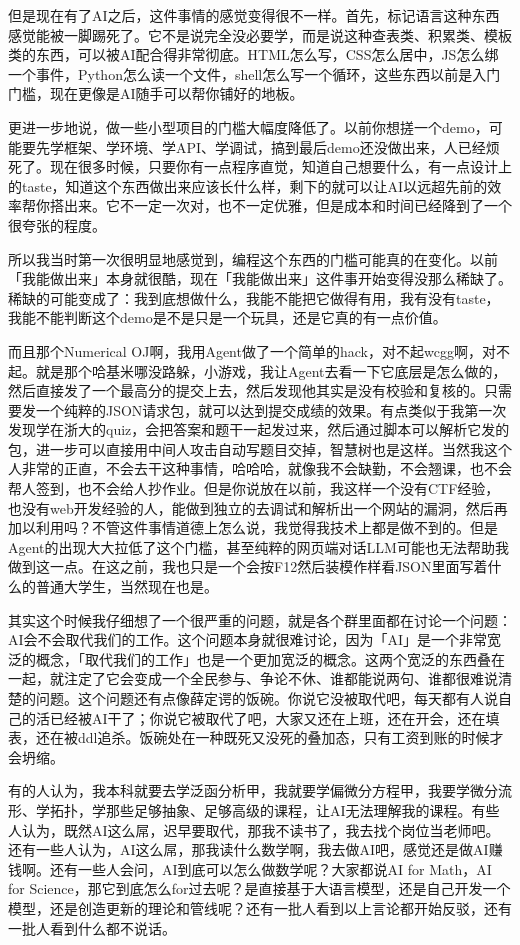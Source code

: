 但是现在有了AI之后，这件事情的感觉变得很不一样。首先，标记语言这种东西感觉能被一脚踢死了。它不是说完全没必要学，而是说这种查表类、积累类、模板类的东西，可以被AI配合得非常彻底。HTML怎么写，CSS怎么居中，JS怎么绑一个事件，Python怎么读一个文件，shell怎么写一个循环，这些东西以前是入门门槛，现在更像是AI随手可以帮你铺好的地板。

更进一步地说，做一些小型项目的门槛大幅度降低了。以前你想搓一个demo，可能要先学框架、学环境、学API、学调试，搞到最后demo还没做出来，人已经烦死了。现在很多时候，只要你有一点程序直觉，知道自己想要什么，有一点设计上的taste，知道这个东西做出来应该长什么样，剩下的就可以让AI以远超先前的效率帮你搭出来。它不一定一次对，也不一定优雅，但是成本和时间已经降到了一个很夸张的程度。

所以我当时第一次很明显地感觉到，编程这个东西的门槛可能真的在变化。以前「我能做出来」本身就很酷，现在「我能做出来」这件事开始变得没那么稀缺了。稀缺的可能变成了：我到底想做什么，我能不能把它做得有用，我有没有taste，我能不能判断这个demo是不是只是一个玩具，还是它真的有一点价值。

而且那个Numerical OJ啊，我用Agent做了一个简单的hack，对不起wcgg啊，对不起。就是那个哈基米哪没路躲，小游戏，我让Agent去看一下它底层是怎么做的，然后直接发了一个最高分的提交上去，然后发现他其实是没有校验和复核的。只需要发一个纯粹的JSON请求包，就可以达到提交成绩的效果。有点类似于我第一次发现学在浙大的quiz，会把答案和题干一起发过来，然后通过脚本可以解析它发的包，进一步可以直接用中间人攻击自动写题目交掉，智慧树也是这样。当然我这个人非常的正直，不会去干这种事情，哈哈哈，就像我不会缺勤，不会翘课，也不会帮人签到，也不会给人抄作业。但是你说放在以前，我这样一个没有CTF经验，也没有web开发经验的人，能做到独立的去调试和解析出一个网站的漏洞，然后再加以利用吗？不管这件事情道德上怎么说，我觉得我技术上都是做不到的。但是Agent的出现大大拉低了这个门槛，甚至纯粹的网页端对话LLM可能也无法帮助我做到这一点。在这之前，我也只是一个会按F12然后装模作样看JSON里面写着什么的普通大学生，当然现在也是。

其实这个时候我仔细想了一个很严重的问题，就是各个群里面都在讨论一个问题：AI会不会取代我们的工作。这个问题本身就很难讨论，因为「AI」是一个非常宽泛的概念，「取代我们的工作」也是一个更加宽泛的概念。这两个宽泛的东西叠在一起，就注定了它会变成一个全民参与、争论不休、谁都能说两句、谁都很难说清楚的问题。这个问题还有点像薛定谔的饭碗。你说它没被取代吧，每天都有人说自己的活已经被AI干了；你说它被取代了吧，大家又还在上班，还在开会，还在填表，还在被ddl追杀。饭碗处在一种既死又没死的叠加态，只有工资到账的时候才会坍缩。

有的人认为，我本科就要去学泛函分析甲，我就要学偏微分方程甲，我要学微分流形、学拓扑，学那些足够抽象、足够高级的课程，让AI无法理解我的课程。有些人认为，既然AI这么屌，迟早要取代，那我不读书了，我去找个岗位当老师吧。还有一些人认为，AI这么屌，那我读什么数学啊，我去做AI吧，感觉还是做AI赚钱啊。还有一些人会问，AI到底可以怎么做数学呢？大家都说AI for Math，AI for Science，那它到底怎么for过去呢？是直接基于大语言模型，还是自己开发一个模型，还是创造更新的理论和管线呢？还有一批人看到以上言论都开始反驳，还有一批人看到什么都不说话。


